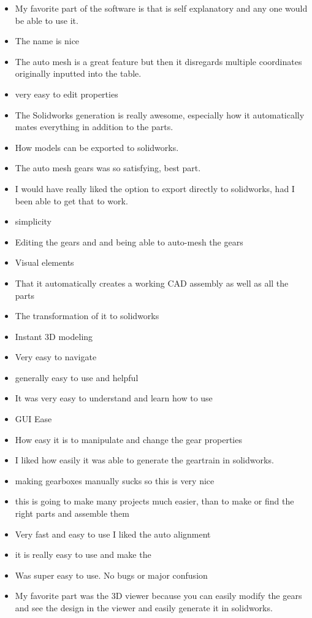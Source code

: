 \begin{itemize}
\item My favorite part of the software is that is self explanatory and any one would be able to use it. 
\item The name is nice
\item The auto mesh is a great feature but then it disregards multiple coordinates originally inputted into the table.
\item very easy to edit properties
\item The Solidworks generation is really awesome, especially how it automatically mates everything in addition to the parts.
\item How models can be exported to solidworks. 
\item The auto mesh gears was so satisfying, best part.
\item I would have really liked the option to export directly to solidworks, had I been able to get that to work.
\item simplicity
\item Editing the gears and and being able to auto-mesh the gears
\item Visual elements
\item That it automatically creates a working CAD assembly as well as all the parts
\item The transformation of it to solidworks
\item Instant 3D modeling 
\item Very easy to navigate
\item generally easy to use and helpful
\item It was very easy to understand and learn how to use
\item GUI Ease
\item How easy it is to manipulate and change the gear properties 
\item I liked how easily it was able to generate the geartrain in solidworks.
\item making gearboxes manually sucks so this is very nice
\item this is going to make many projects much easier, than to make or find the right parts and assemble them 
\item Very fast and easy to use I liked the auto alignment
\item it is really easy to use and make the 
\item Was super easy to use. No bugs or major confusion
\item My favorite part was the 3D viewer because you can easily modify the gears and see the design in the viewer and easily generate it in solidworks.

\end{itemize}
